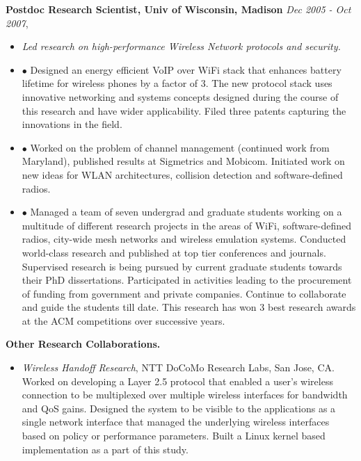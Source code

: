 \begin{resume}
    {\bf Postdoc Research Scientist, Univ of Wisconsin, Madison} \hfill{\it Dec 2005 - Oct 2007},\\
          \begin{itemize}
              \item []{\it Led research on high-performance Wireless Network protocols and security.}\\
              \item []$\bullet$ Designed an energy efficient VoIP over WiFi stack that
		enhances battery lifetime for wireless phones by a factor of 3.
		The new protocol stack uses innovative networking and systems
		concepts designed during the course of this research and have
		wider applicability. Filed three patents capturing the
		innovations in the field.\\
    \item []$\bullet$ Worked on the problem of channel management (continued work from Maryland), published
		results at Sigmetrics and Mobicom. Initiated work on new ideas for WLAN architectures, collision detection and software-defined radios.\\
    \item []$\bullet$ Managed a team of seven undergrad and graduate students working on a multitude of different research
projects  in the areas of WiFi, software-defined radios, city-wide mesh
networks and wireless emulation systems. Conducted world-class research and
published at top tier conferences and journals. Supervised research is being
pursued by current graduate students towards their PhD dissertations. Participated in activities
leading to the procurement of funding from government and private companies. Continue to collaborate and guide the
students till date. This research has won 3 best research awards at the ACM competitions over successive years.
    \end{itemize}

  {\bf Other Research Collaborations.} 
    \begin{itemize}
         \item[] {\it Wireless Handoff Research},  NTT DoCoMo Research Labs, San Jose, CA.\\
		 Worked on developing a Layer 2.5 protocol that enabled a user's wireless connection to be
                 multiplexed over multiple wireless interfaces for bandwidth and QoS gains. Designed the system to be visible to the applications as a single
                 network interface that managed the underlying wireless interfaces based on policy or performance parameters. Built a Linux kernel based
                 implementation as a part of this study.


\end{itemize}
\end{resume}
